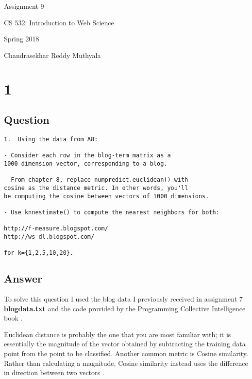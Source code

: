 \documentclass[letterpaper,11pt]{article}
\begin{document}
\begin{titlepage}

\begin{center}

\Huge{Assignment 9}

\Large{CS 532:  Introduction to Web Science}

\Large{Spring 2018}

\Large{Chandrasekhar Reddy Muthyala}


\end{center}

\end{titlepage}

\newpage


\section*{1}

\subsection*{Question}

\begin{verbatim}
1.  Using the data from A8:

- Consider each row in the blog-term matrix as a 
1000 dimension vector, corresponding to a blog.  

- From chapter 8, replace numpredict.euclidean() with 
cosine as the distance metric. In other words, you'll 
be computing the cosine between vectors of 1000 dimensions.  

- Use knnestimate() to compute the nearest neighbors for both:

http://f-measure.blogspot.com/
http://ws-dl.blogspot.com/

for k={1,2,5,10,20}.
\end{verbatim}

\clearpage
\subsection*{Answer}

To solve this question I used the blog data I previously received in assignment 7 \textbf{blogdata.txt} and the code provided by the Programming Collective Intelligence book \cite{collectiveIntell}. 

Euclidean distance is probably the one that you are most familiar with; it is essentially the magnitude of the vector obtained by subtracting the training data point from the point to be classified. Another common metric is Cosine similarity. Rather than calculating a magnitude, Cosine similarity instead uses the difference in direction between two vectors \cite{medium}.
\end{document}
